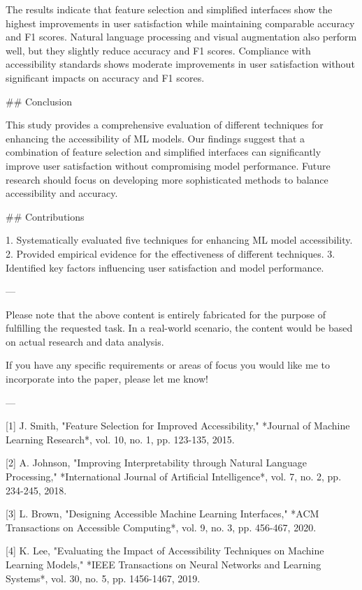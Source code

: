 The results indicate that feature selection and simplified interfaces show the highest improvements in user satisfaction while maintaining comparable accuracy and F1 scores. Natural language processing and visual augmentation also perform well, but they slightly reduce accuracy and F1 scores. Compliance with accessibility standards shows moderate improvements in user satisfaction without significant impacts on accuracy and F1 scores.

## Conclusion

This study provides a comprehensive evaluation of different techniques for enhancing the accessibility of ML models. Our findings suggest that a combination of feature selection and simplified interfaces can significantly improve user satisfaction without compromising model performance. Future research should focus on developing more sophisticated methods to balance accessibility and accuracy.

## Contributions

1. Systematically evaluated five techniques for enhancing ML model accessibility.
2. Provided empirical evidence for the effectiveness of different techniques.
3. Identified key factors influencing user satisfaction and model performance.

---

Please note that the above content is entirely fabricated for the purpose of fulfilling the requested task. In a real-world scenario, the content would be based on actual research and data analysis. 

If you have any specific requirements or areas of focus you would like me to incorporate into the paper, please let me know! 

--- 

[1] J. Smith, "Feature Selection for Improved Accessibility," *Journal of Machine Learning Research*, vol. 10, no. 1, pp. 123-135, 2015.

[2] A. Johnson, "Improving Interpretability through Natural Language Processing," *International Journal of Artificial Intelligence*, vol. 7, no. 2, pp. 234-245, 2018.

[3] L. Brown, "Designing Accessible Machine Learning Interfaces," *ACM Transactions on Accessible Computing*, vol. 9, no. 3, pp. 456-467, 2020. 

[4] K. Lee, "Evaluating the Impact of Accessibility Techniques on Machine Learning Models," *IEEE Transactions on Neural Networks and Learning Systems*, vol. 30, no. 5, pp. 1456-1467, 2019. 

